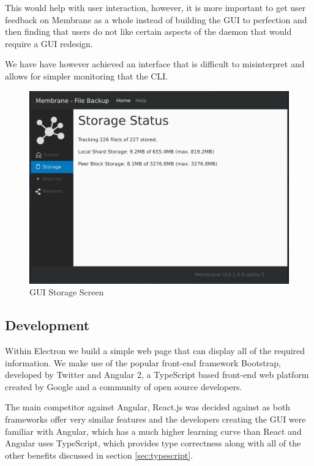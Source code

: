 \documentclass[11pt, a4paper, twocolumn, twoside]{report}
\begin{document}
This would help with user interaction, however, it is more important to get user feedback on Membrane as a whole instead of building the GUI to perfection and then finding that users do not like certain aspects of the daemon that would require a GUI redesign. 

We have have however achieved an interface that is difficult to misinterpret and allows for simpler monitoring that the CLI.

\begin{figure}[!ht]
 \centering
 \includegraphics[width=\textwidth]{gui-storage}
 \caption{GUI Storage Screen}
 \label{fig:gui-storage}
\end{figure}

\subsection{Development}

Within Electron we build a simple web page that can display all of the required information. We make use of the popular front-end framework Bootstrap, developed by Twitter and Angular 2, a TypeScript based front-end web platform created by Google and a community of open source developers.

The main competitor against Angular, React.js was decided against as both frameworks offer very similar features and the developers creating the GUI were familiar with Angular, which has a much higher learning curve than React \citep{house2016ng2react} and Angular uses TypeScript, which provides type correctness along with all of the other benefits discussed in section \ref{sec:typescript}.
\end{document}
